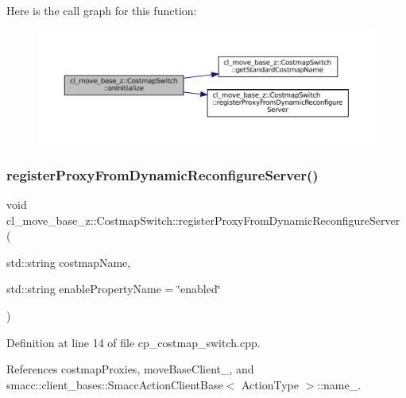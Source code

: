 Here is the call graph for this function\+:
\nopagebreak
\begin{figure}[H]
\begin{center}
\leavevmode
\includegraphics[width=350pt]{classcl__move__base__z_1_1CostmapSwitch_ad4d125cd563ed0bb76d27226bc47e63e_cgraph}
\end{center}
\end{figure}
\mbox{\label{classcl__move__base__z_1_1CostmapSwitch_a0d04ca7b655f850ba3107393f1c437cb}} 
\subsubsection{\texorpdfstring{register\+Proxy\+From\+Dynamic\+Reconfigure\+Server()}{registerProxyFromDynamicReconfigureServer()}}
{\footnotesize\ttfamily void cl\+\_\+move\+\_\+base\+\_\+z\+::\+Costmap\+Switch\+::register\+Proxy\+From\+Dynamic\+Reconfigure\+Server (\begin{DoxyParamCaption}\item[{std\+::string}]{costmap\+Name,  }\item[{std\+::string}]{enable\+Property\+Name = {\ttfamily \char`\"{}enabled\char`\"{}} }\end{DoxyParamCaption})}



Definition at line 14 of file cp\+\_\+costmap\+\_\+switch.\+cpp.



References costmap\+Proxies, move\+Base\+Client\+\_\+, and smacc\+::client\+\_\+bases\+::\+Smacc\+Action\+Client\+Base$<$ Action\+Type $>$\+::name\+\_\+.



